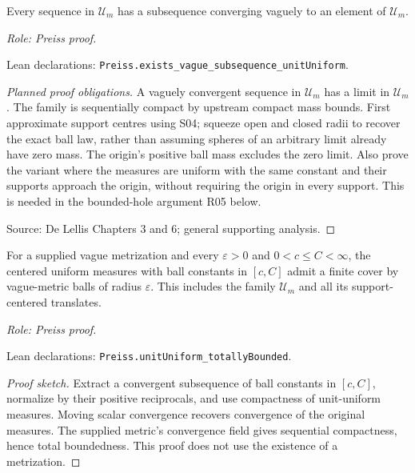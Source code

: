 \begin{lemma}
\label{lem:uniform-compactness}






Every sequence in $\mathcal U_m$ has a subsequence converging vaguely to an element of $\mathcal U_m$.
\par\emph{Role: Preiss proof.}
\par Lean declarations: \texttt{Preiss.exists\_vague\_subsequence\_unitUniform}.
\end{lemma}
\begin{proof}[Planned proof obligations]

A vaguely convergent sequence in $\mathcal U_m$ has a limit in $\mathcal U_m$.
The family is sequentially compact by upstream compact mass bounds.
First approximate support centres using S04; squeeze open and closed radii to
recover the exact ball law, rather than assuming spheres of an arbitrary limit
already have zero mass. The origin's positive ball mass excludes the zero limit.
Also prove the variant where the measures are uniform with the same constant
and their supports approach the origin, without requiring the origin in every
support. This is needed in the bounded-hole argument R05 below.
\par Source: De Lellis Chapters 3 and 6; general supporting analysis.
\end{proof}

\begin{lemma}
\label{lem:uniform-finite-metric-covers}






For a supplied vague metrization and every $\varepsilon>0$ and $0<c\leq C<\infty$, the centered uniform measures with ball constants in $[c,C]$ admit a finite cover by vague-metric balls of radius $\varepsilon$. This includes the family $\mathcal U_m$ and all its support-centered translates.
\par\emph{Role: Preiss proof.}
\par Lean declarations: \texttt{Preiss.unitUniform\_totallyBounded}.
\end{lemma}
\begin{proof}[Proof sketch]
Extract a convergent subsequence of ball constants in $[c,C]$, normalize by their positive reciprocals, and use compactness of unit-uniform measures. Moving scalar convergence recovers convergence of the original measures. The supplied metric's convergence field gives sequential compactness, hence total boundedness. This proof does not use the existence of a metrization.
\end{proof}


